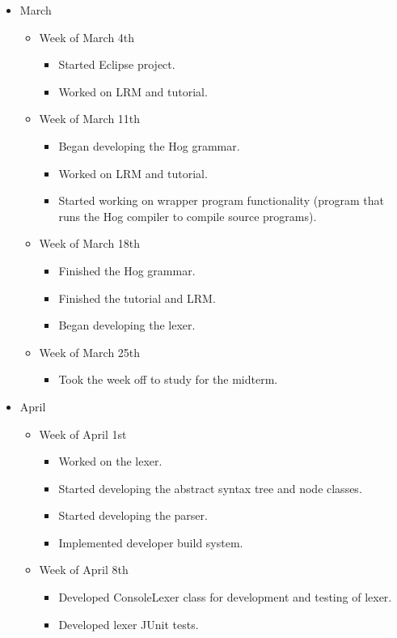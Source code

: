 \documentclass{book}
\begin{document}
\begin{itemize}
\item[] March
\begin{itemize}
\item[] Week of March 4th
\begin{itemize}
\item Started Eclipse project.
\item Worked on LRM and tutorial.
\end{itemize} %
\item[] Week of March 11th
\begin{itemize}
\item Began developing the Hog grammar.
\item Worked on LRM and tutorial.
\item Started working on wrapper program functionality (program that runs the
Hog compiler to compile source programs).
\end{itemize} %
\item[] Week of March 18th
\begin{itemize}
\item Finished the Hog grammar.
\item Finished the tutorial and LRM.
\item Began developing the lexer.
\end{itemize}
\item[] Week of March 25th
\begin{itemize}
\item Took the week off to study for the midterm.
\end{itemize}
\end{itemize} %
\item[] April
\begin{itemize}
\item[] Week of April 1st
\begin{itemize}
\item Worked on the lexer.
\item Started developing the abstract syntax tree and node classes.
\item Started developing the parser.
\item Implemented developer build system.
\end{itemize} 
\item[] Week of April 8th
\begin{itemize}
\item Developed ConsoleLexer class for development and testing of lexer. 
\item Developed lexer JUnit tests. 

\end{itemize}
\end{itemize}
\end{itemize}
\end{document}
